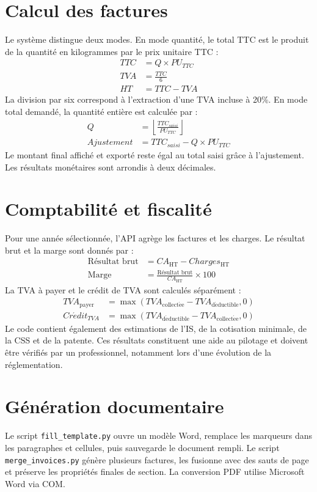 \documentclass[12pt,a4paper,oneside]{report}
\newcommand{\code}[1]{\texttt{#1}}
\begin{document}
\section{Calcul des factures}
Le système distingue deux modes. En mode quantité, le total TTC est le produit de la quantité en kilogrammes par le prix unitaire TTC :
\begin{align}
TTC &= Q \times PU_{TTC} \\
TVA &= \frac{TTC}{6} \\
HT &= TTC - TVA
\end{align}
La division par six correspond à l'extraction d'une TVA incluse à 20\%. En mode total demandé, la quantité entière est calculée par :
\begin{align}
Q &= \left\lfloor \frac{TTC_{saisi}}{PU_{TTC}} \right\rfloor \\
Ajustement &= TTC_{saisi} - Q \times PU_{TTC}
\end{align}
Le montant final affiché et exporté reste égal au total saisi grâce à l'ajustement. Les résultats monétaires sont arrondis à deux décimales.

\section{Comptabilité et fiscalité}
Pour une année sélectionnée, l'API agrège les factures et les charges. Le résultat brut et la marge sont donnés par :
\begin{align}
\text{Résultat brut} &= CA_{\mathrm{HT}} - Charges_{\mathrm{HT}} \\
\text{Marge} &= \frac{\text{Résultat brut}}{CA_{\mathrm{HT}}} \times 100
\end{align}
La TVA à payer et le crédit de TVA sont calculés séparément :
\begin{align}
TVA_{\mathrm{payer}} &= \max(TVA_{\mathrm{collect\acute{e}e}}-TVA_{\mathrm{d\acute{e}ductible}},0)\\
Cr\acute{e}dit_{TVA} &= \max(TVA_{\mathrm{d\acute{e}ductible}}-TVA_{\mathrm{collect\acute{e}e}},0)
\end{align}
Le code contient également des estimations de l'IS, de la cotisation minimale, de la CSS et de la patente. Ces résultats constituent une aide au pilotage et doivent être vérifiés par un professionnel, notamment lors d'une évolution de la réglementation.

\section{Génération documentaire}
Le script \code{fill\_template.py} ouvre un modèle Word, remplace les marqueurs dans les paragraphes et cellules, puis sauvegarde le document rempli. Le script \code{merge\_invoices.py} génère plusieurs factures, les fusionne avec des sauts de page et préserve les propriétés finales de section. La conversion PDF utilise Microsoft Word via COM.
\end{document}
